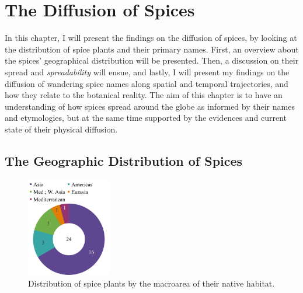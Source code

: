 \chapter{The Diffusion of Spices}
\label{ch:diffusion}





In this chapter, I will present the findings on the diffusion of spices, by looking at the distribution of spice plants and their primary names. First, an overview about the spices' geographical distribution will be presented. Then, a discussion on their spread and \textit{spreadability} will ensue, and lastly, I will present my findings on the diffusion of wandering spice names along spatial and temporal trajectories, and how they relate to the botanical reality. The aim of this chapter is to have an understanding of how spices spread around the globe as informed by their names and etymologies, but at the same time supported by the evidences and current state of their physical diffusion.

\section{The Geographic Distribution of Spices}

\begin{figure}
    \vspace{-\baselineskip}
    \includegraphics[width=0.33\textwidth]{imgs/plots/macroarea_pie.pdf}
    \caption[Distribution of spice plants by the macroarea of their native habitat.]{Distribution of spice plants by the macroarea of their native habitat.}
    \label{fig:macroarea_pie}
  \end{figure}
  
